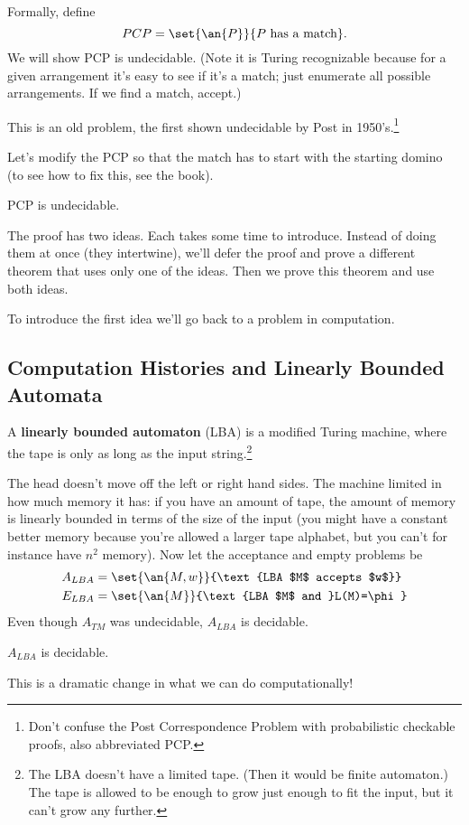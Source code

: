 Formally, define
\[
PCP=\set{\an{P}}{P\text{ has a match}}.
\]
We will show PCP is undecidable. (Note it is Turing recognizable because for a given arrangement it's easy to see if it's a match; just enumerate all possible arrangements. If we find a match, accept.)

This is an old problem, the first shown undecidable by Post in 1950's.\footnote{Don't confuse the Post Correspondence Problem with probabilistic checkable proofs, also abbreviated PCP.}

Let's modify the PCP so that the match has to start with the starting domino (to see how to fix this, see the book).

\begin{thm}
PCP is undecidable.
\end{thm}
The proof has two ideas. Each takes some time to introduce. Instead of doing them at once (they intertwine), we'll defer the proof and prove a different theorem that uses only one of the ideas. Then we prove this theorem and use both ideas.

To introduce the first idea we'll go back to a problem in computation. 
\subsection{Computation Histories and Linearly Bounded Automata}
\begin{df}
A \textbf{linearly bounded automaton} (LBA) is a modified Turing machine, where the tape is only as long as the input string.\footnote{The LBA doesn't have a limited tape. (Then it would be finite automaton.) The tape is allowed to be enough to grow just enough to fit the input, but it can't grow any further. }
\end{df}
The head doesn't move off the left or right hand sides. The machine limited in how much memory it has: if you have an amount of tape, the amount of memory is linearly  bounded in terms of the size of the input (you might have a constant better memory because you're allowed a larger tape alphabet, but you can't for instance have $n^2$ memory). 
Now let the acceptance and empty problems be
\begin{align*}
A_{LBA}&=\set{\an{M,w}}{\text{LBA $M$ accepts $w$}}\\
E_{LBA}&=\set{\an{M}}{\text{LBA $M$ and }L(M)=\phi}
\end{align*}
Even though $A_{TM}$ was undecidable, $A_{LBA}$ is decidable.
\begin{thm}
$A_{LBA}$ is decidable.
\end{thm}
This is a dramatic change in what we can do computationally!


